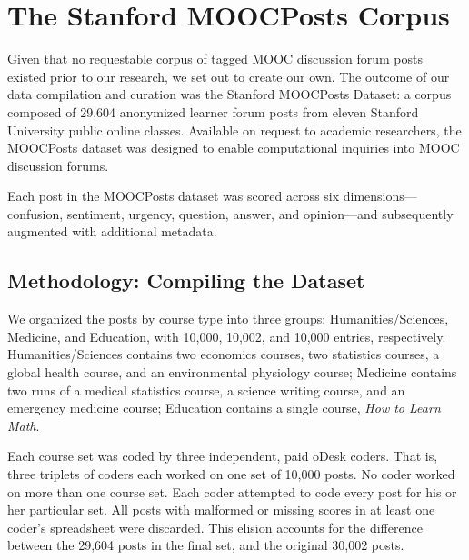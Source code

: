 \documentclass{edm_template}
\begin{document}
\section{The Stanford MOOCPosts Corpus}
\label{sec:MOOCPosts}

Given that no requestable corpus of tagged MOOC discussion forum posts existed prior to our research, we set out to create our own. The outcome of our data compilation and curation was the Stanford MOOCPosts Dataset: a corpus composed of 29,604 anonymized learner forum posts from eleven Stanford University public online classes. Available on request to academic researchers, the MOOCPosts dataset was designed to enable computational inquiries into MOOC discussion forums.

Each post in the MOOCPosts dataset was scored across six dimensions---confusion, sentiment, urgency, question, answer, and opinion---and subsequently augmented with additional metadata.


\subsection{Methodology: Compiling the Dataset}
We organized the posts by course type into three groups: Humanities/Sciences, Medicine, and Education, with 10,000, 10,002, and 10,000 entries, respectively. Humanities/Sciences contains two economics courses, two statistics courses, a global health course, and an environmental physiology course; Medicine contains two runs of a medical statistics course, a science writing course, and an emergency medicine course; Education contains a single course, \emph{How to Learn Math}. 

Each course set was coded by three independent, paid oDesk coders. That is, three triplets of coders each worked on one set of 10,000 posts. No coder worked on more than one course set. Each coder attempted to code every post for his or her particular set. All posts with malformed or missing scores in at least one coder's spreadsheet were discarded. This elision accounts for the difference between the 29,604 posts in the final set, and the original 30,002 posts.
\end{document}
